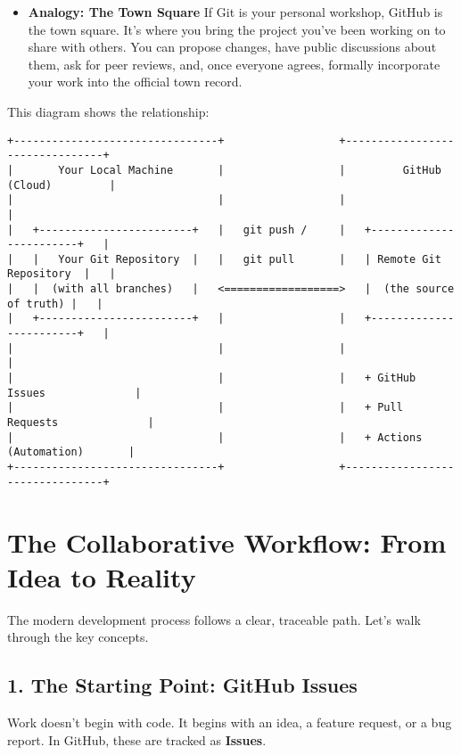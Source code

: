 \documentclass[
  letterpaper,
  DIV=11,
  numbers=noendperiod]{scrreprt}
\providecommand{\tightlist}{%
  \setlength{\itemsep}{0pt}\setlength{\parskip}{0pt}}
\begin{document}
\begin{itemize}
\tightlist
\item
  \textbf{Analogy: The Town Square} If Git is your personal workshop,
  GitHub is the town square. It's where you bring the project you've
  been working on to share with others. You can propose changes, have
  public discussions about them, ask for peer reviews, and, once
  everyone agrees, formally incorporate your work into the official town
  record.
\end{itemize}

This diagram shows the relationship:

\begin{verbatim}
+--------------------------------+                  +--------------------------------+
|       Your Local Machine       |                  |         GitHub (Cloud)         |
|                                |                  |                                |
|   +------------------------+   |   git push /     |   +------------------------+   |
|   |   Your Git Repository  |   |   git pull       |   | Remote Git Repository  |   |
|   |  (with all branches)   |   <==================>   |  (the source of truth) |   |
|   +------------------------+   |                  |   +------------------------+   |
|                                |                  |                                |
|                                |                  |   + GitHub Issues              |
|                                |                  |   + Pull Requests              |
|                                |                  |   + Actions (Automation)       |
+--------------------------------+                  +--------------------------------+
\end{verbatim}

\section{The Collaborative Workflow: From Idea to
Reality}\label{the-collaborative-workflow-from-idea-to-reality}

The modern development process follows a clear, traceable path. Let's
walk through the key concepts.

\subsection{1. The Starting Point: GitHub
Issues}\label{the-starting-point-github-issues}

Work doesn't begin with code. It begins with an idea, a feature request,
or a bug report. In GitHub, these are tracked as \textbf{Issues}.
\end{document}
